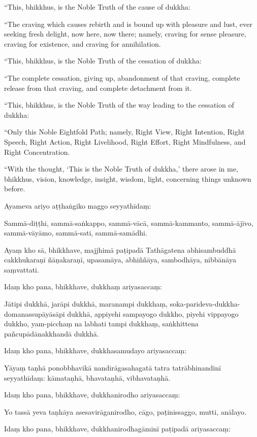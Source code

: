 ``This, bhikkhus, is the Noble Truth of the cause of dukkha:

``The craving which causes rebirth and is bound up with pleasure and
lust, ever seeking fresh delight, now here, now there; namely, craving
for sense pleasure, craving for existence, and craving for annihilation.

``This, bhikkhus, is the Noble Truth of the cessation of dukkha:

``The complete cessation, giving up, abandonment of that craving,
complete release from that craving, and complete detachment from it.

``This, bhikkhus, is the Noble Truth of the way leading to the cessation
of dukkha:

``Only this Noble Eightfold Path; namely, Right View, Right Intention,
Right Speech, Right Action, Right Livelihood, Right Effort, Right
Mindfulness, and Right Concentration.

``With the thought, `This is the Noble Truth of dukkha,' there arose in
me, bhikkhus, vision, knowledge, insight, wisdom, light, concerning
things unknown before.

\clearpage

\paliText

Ayameva ariyo aṭṭhaṅgiko maggo seyyathīdaṃ:

Sammā-diṭṭhi, sammā-saṅkappo, sammā-vācā, sammā-kammanto, sammā-ājīvo,
sammā-vāyāmo, sammā-sati, sammā-samādhi.

Ayaṃ kho sā, bhikkhave, majjhimā paṭipadā Tathāgatena abhisambuddhā
cakkhukaraṇī ñāṇakaraṇī, upasamāya, abhiññāya, sambodhāya, nibbānāya
saṃvattati.

Idaṃ kho pana, bhikkhave, dukkhaṃ ariyasaccaṃ:

Jātipi dukkhā, jarāpi dukkhā, maranampi dukkhaṃ,
soka-parideva-dukkha-domanassupāyāsāpi dukkhā, appiyehi sampayogo
dukkho, piyehi vippayogo dukkho, yam-picchaṃ na labhati tampi dukkhaṃ,
saṅkhittena pañcupādānakkhandā dukkhā.

Idaṃ kho pana, bhikkhave, dukkhasamudayo ariyasaccaṃ:

Yāyaṃ taṇhā ponobbhavikā nandirāgasahagatā tatra tatrābhinandinī
seyyathīdaṃ: kāmataṇhā, bhavataṇhā, vibhavataṇhā.

Idaṃ kho pana, bhikkhave, dukkhanirodho ariyasaccaṃ:

Yo tassā yeva taṇhāya asesavirāganirodho, cāgo, paṭinissaggo, mutti,
anālayo.

Idaṃ kho pana, bhikkhave, dukkhanirodhagāminī paṭipadā ariyasaccaṃ:

